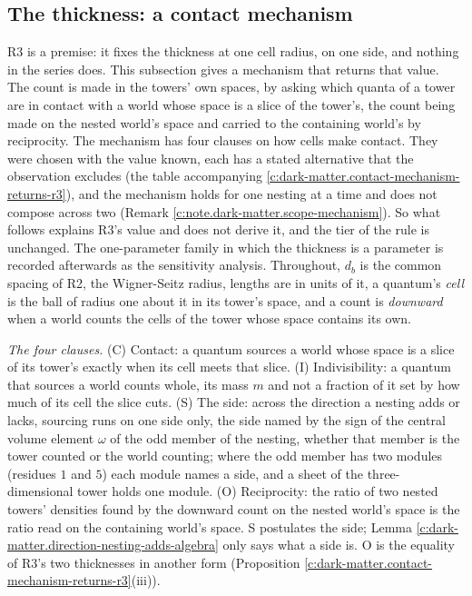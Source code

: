 \documentclass[11pt]{article}
\theoremstyle{definition}
\theoremstyle{plain}
\begin{document}
\subsection*{The thickness: a contact mechanism}
\label{c:note.dark-matter.setting-thickness-contact-mechanism}
R3 is a premise: it fixes the thickness at one cell radius, on one side, and nothing in the series does. This subsection gives a mechanism that returns that value. The count is made in the towers' own spaces, by asking which quanta of a tower are in contact with a world whose space is a slice of the tower's, the count being made on the nested world's space and carried to the containing world's by reciprocity. The mechanism has four clauses on how cells make contact. They were chosen with the value known, each has a stated alternative that the observation excludes (the table accompanying \ref{c:dark-matter.contact-mechanism-returns-r3}), and the mechanism holds for one nesting at a time and does not compose across two (Remark \ref{c:note.dark-matter.scope-mechanism}). So what follows explains R3's value and does not derive it, and the tier of the rule is unchanged. The one-parameter family in which the thickness is a parameter is recorded afterwards as the sensitivity analysis. Throughout, $d_{b}$ is the common spacing of R2, the Wigner-Seitz radius, lengths are in units of it, a quantum's \emph{cell} is the ball of radius one about it in its tower's space, and a count is \emph{downward} when a world counts the cells of the tower whose space contains its own.

\emph{The four clauses.} (C) Contact: a quantum sources a world whose space is a slice of its tower's exactly when its cell meets that slice. (I) Indivisibility: a quantum that sources a world counts whole, its mass $m$ and not a fraction of it set by how much of its cell the slice cuts. (S) The side: across the direction a nesting adds or lacks, sourcing runs on one side only, the side named by the sign of the central volume element $\omega$ of the odd member of the nesting, whether that member is the tower counted or the world counting; where the odd member has two modules (residues $1$ and $5$) each module names a side, and a sheet of the three-dimensional tower holds one module. (O) Reciprocity: the ratio of two nested towers' densities found by the downward count on the nested world's space is the ratio read on the containing world's space. S postulates the side; Lemma \ref{c:dark-matter.direction-nesting-adds-algebra} only says what a side is. O is the equality of R3's two thicknesses in another form (Proposition \ref{c:dark-matter.contact-mechanism-returns-r3}(iii)).
\end{document}
